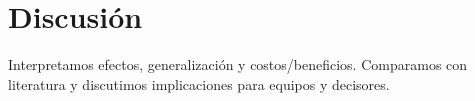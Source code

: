 \section{Discusión}
Interpretamos efectos, generalización y costos/beneficios. Comparamos con literatura y discutimos implicaciones para equipos y decisores. 